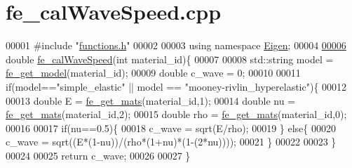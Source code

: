\hypertarget{fe__cal_wave_speed_8cpp_source}{}\section{fe\+\_\+cal\+Wave\+Speed.\+cpp}
\label{fe__cal_wave_speed_8cpp_source}

\begin{DoxyCode}
00001 \textcolor{preprocessor}{#include "\hyperlink{functions_8h}{functions.h}"}
00002 
00003 \textcolor{keyword}{using namespace }\hyperlink{namespace_eigen}{Eigen};
00004 
\hyperlink{fe__cal_wave_speed_8cpp_a20aed1a2d3d8b470592491a96e60be87}{00006} \textcolor{keywordtype}{double} \hyperlink{fe__cal_wave_speed_8cpp_a20aed1a2d3d8b470592491a96e60be87}{fe\_calWaveSpeed}(\textcolor{keywordtype}{int} material\_id)\{
00007 
00008     std::string model = \hyperlink{functions_8h_a34d6fb85943d945b7e8600d2ef4220d0}{fe\_get\_model}(material\_id);
00009     \textcolor{keywordtype}{double} c\_wave = 0;
00010 
00011     \textcolor{keywordflow}{if}(model==\textcolor{stringliteral}{"simple\_elastic"} || model == \textcolor{stringliteral}{"mooney-rivlin\_hyperelastic"})\{
00012 
00013         \textcolor{keywordtype}{double} E = \hyperlink{functions_8h_af7ffbad6dfcc99fc88b130c1a7b1720a}{fe\_get\_mats}(material\_id,1);
00014         \textcolor{keywordtype}{double} nu = \hyperlink{functions_8h_af7ffbad6dfcc99fc88b130c1a7b1720a}{fe\_get\_mats}(material\_id,2);
00015         \textcolor{keywordtype}{double} rho = \hyperlink{functions_8h_af7ffbad6dfcc99fc88b130c1a7b1720a}{fe\_get\_mats}(material\_id,0);
00016 
00017         \textcolor{keywordflow}{if}(nu==0.5)\{
00018             c\_wave = sqrt(E/rho);
00019         \} \textcolor{keywordflow}{else}\{
00020             c\_wave = sqrt((E*(1-nu))/(rho*(1+nu)*(1-(2*nu))));
00021         \}
00022 
00023     \}
00024 
00025     \textcolor{keywordflow}{return} c\_wave;
00026 
00027 \}
\end{DoxyCode}
